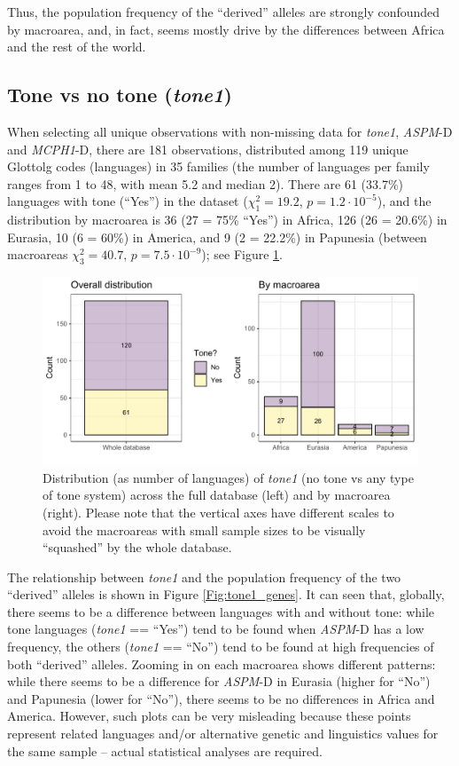 \documentclass[twoside,onecolumn]{article}
\begin{document}
Thus, the population frequency of the ``derived'' alleles are strongly confounded by macroarea, and, in fact, seems mostly drive by the differences between Africa and the rest of the world.


\subsection{Tone vs no tone (\textit{tone1})}

When selecting all unique observations with non-missing data for \textit{tone1}, \textit{ASPM}-D and \textit{MCPH1}-D, there are 181 observations, distributed among 119 unique Glottolg codes (languages) in 35 families (the number of languages per family ranges from 1 to 48, with mean 5.2 and median 2).
There are 61 (33.7\%) languages with tone (``Yes'') in the dataset ($\chi^2_{1} = 19.2$, $p = 1.2\cdot10^{-5}$), and the distribution by macroarea is 36 (27 = 75\% ``Yes'') in Africa, 126 (26 = 20.6\%) in Eurasia, 10 (6 = 60\%) in America, and 9 (2 = 22.2\%) in Papunesia (between macroareas $\chi^2_{3} = 40.7$, $p = 7.5\cdot10^{-9}$); see Figure \ref{Fig:tone1_distribution}.

\begin{figure}[h]
  \centering
  \includegraphics[width=\textwidth]{../../code/figures/tone1_distribution}
  \caption{Distribution (as number of languages) of \textit{tone1} (no tone vs any type of tone system) across the full database (left) and by macroarea (right). Please note that the vertical axes have different scales to avoid the macroareas with small sample sizes to be visually ``squashed'' by the whole database.}
  \label{Fig:tone1_distribution}
\end{figure}

The relationship between \textit{tone1} and the population frequency of the two ``derived'' alleles is shown in Figure \ref{Fig:tone1_genes}.
It can seen that, globally, there seems to be a difference between languages with and without tone: while tone languages (\textit{tone1} == ``Yes'') tend to be found when \textit{ASPM}-D has a low frequency, the others (\textit{tone1} == ``No'') tend to be found at high frequencies of both ``derived'' alleles.
Zooming in on each macroarea shows different patterns: while there seems to be a difference for \textit{ASPM}-D in Eurasia (higher for ``No'') and Papunesia (lower for ``No''), there seems to be no differences in Africa and America.
However, such plots can be very misleading because these points represent related languages and/or alternative genetic and linguistics values for the same sample -- actual statistical analyses are required.
\end{document}
